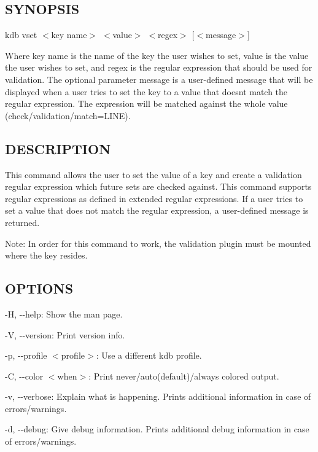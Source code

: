 \subsection*{S\+Y\+N\+O\+P\+S\+IS}

{\ttfamily kdb vset $<$key name$>$ $<$value$>$ $<$regex$>$ \mbox{[}$<$message$>$\mbox{]}}

Where {\ttfamily key name} is the name of the key the user wishes to set, {\ttfamily value} is the value the user wishes to set, and {\ttfamily regex} is the regular expression that should be used for validation. The optional parameter {\ttfamily message} is a user-\/defined message that will be displayed when a user tries to set the key to a value that doesn\textquotesingle{}t match the regular expression. The expression will be matched against the whole value ({\ttfamily check/validation/match=L\+I\+NE}).

\subsection*{D\+E\+S\+C\+R\+I\+P\+T\+I\+ON}

This command allows the user to set the value of a key and create a validation regular expression which future sets are checked against. This command supports regular expressions as defined in extended regular expressions. If a user tries to set a value that does not match the regular expression, a user-\/defined message is returned.

Note\+: In order for this command to work, the {\ttfamily validation} plugin must be mounted where the key resides.

\subsection*{O\+P\+T\+I\+O\+NS}


\begin{DoxyItemize}
\item {\ttfamily -\/H}, {\ttfamily -\/-\/help}\+: Show the man page.
\item {\ttfamily -\/V}, {\ttfamily -\/-\/version}\+: Print version info.
\item {\ttfamily -\/p}, {\ttfamily -\/-\/profile $<$profile$>$}\+: Use a different kdb profile.
\item {\ttfamily -\/C}, {\ttfamily -\/-\/color $<$when$>$}\+: Print never/auto(default)/always colored output.
\item {\ttfamily -\/v}, {\ttfamily -\/-\/verbose}\+: Explain what is happening. Prints additional information in case of errors/warnings.
\item {\ttfamily -\/d}, {\ttfamily -\/-\/debug}\+: Give debug information. Prints additional debug information in case of errors/warnings.
\end{DoxyItemize}

